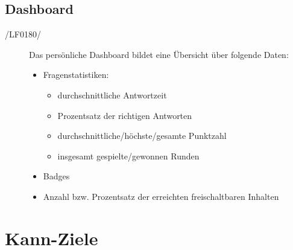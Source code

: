 \documentclass[11pt,a4paper]{scrreprt}
\begin{document}
\subsection{Dashboard}
\begin{description}
\item[/LF0180/] Das persönliche Dashboard bildet eine Übersicht über folgende Daten: \\
	\begin{itemize}
	\item Fragenstatistiken:
		\begin{itemize}
		\item durchschnittliche Antwortzeit
		\item Prozentsatz der richtigen Antworten
		\item durchschnittliche/höchste/gesamte Punktzahl
		\item insgesamt gespielte/gewonnen Runden
		\end{itemize}
	\item Badges
	\item Anzahl bzw. Prozentsatz der erreichten freischaltbaren Inhalten
	\end{itemize}
\end{description}
\section{Kann-Ziele}
\end{document}

